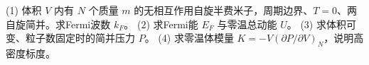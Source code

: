 (1) 体积 \(V\) 内有 \(N\) 个质量 \(m\) 的无相互作用自旋半费米子，周期边界、\(T=0\)、两自旋简并。求Fermi波数 \(k_F\)。
(2) 求Fermi能 \(E_F\) 与零温总动能 \(U\)。
(3) 求体积可变、粒子数固定时的简并压力 \(P\)。
(4) 求零温体模量 \(K=-V(\partial P/\partial V)_N\)，说明高密度标度。
